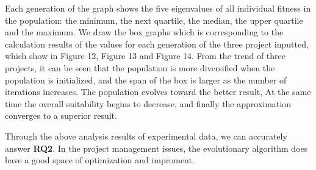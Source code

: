Each generation of the graph shows the five eigenvalues of all individual 
fitness in the population: the minimum, the next quartile, the median, the 
upper quartile and the maximum. We draw the box graphs which is corresponding 
to the calculation results of the values for each generation of the three 
project inputted, which show in Figure 12, Figure 13 and Figure 14. From the 
trend of three projects, it can be seen that the population is more 
diversified when the population is initialized, and the span of the box is 
larger as the number of iterations increases. The population evolves toward 
the better result, At the same time the overall suitability begins to 
decrease, and finally the approximation converges to a superior result.


Through the above analysis results of experimental data, we can accurately 
answer \textbf{RQ2}. In the project management issues, the evolutionary algorithm does 
have a good space of optimization and improment.





